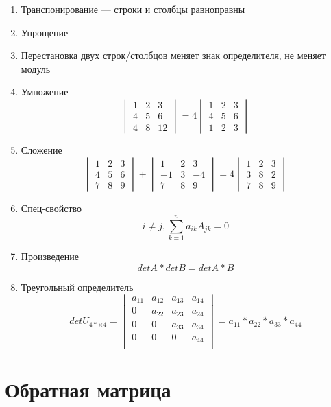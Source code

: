 \documentclass{article}
\begin{document}
\begin{enumerate}
	\item Транспонирование --- строки и столбцы равноправны
	\item Упрощение
	\item Перестановка двух строк/столбцов меняет знак определителя, не меняет модуль
	\item Умножение
	\[
	\begin{vmatrix}
		1 & 2 & 3 \\
		4 & 5 & 6 \\
		4 & 8 & 12
	\end{vmatrix} =
	4 \begin{vmatrix}
		1 & 2 & 3 \\
		4 & 5 & 6 \\
		1 & 2 & 3
	\end{vmatrix}
	\]
	\item Сложение
	\[
	\begin{vmatrix}
		1 & 2 & 3 \\
		4 & 5 & 6 \\
		7 & 8 & 9
	\end{vmatrix} +
	\begin{vmatrix}
		1 & 2 & 3 \\
		-1 & 3 & -4 \\
		7 & 8 & 9
	\end{vmatrix} =
	4 \begin{vmatrix}
		1 & 2 & 3 \\
		3 & 8 & 2 \\
		7 & 8 & 9
	\end{vmatrix}
	\]
	\item Спец-свойство
	\[
	i \ne j, \sum_{k=1}^{n} a_{ik} A_{jk} = 0
	\]
	\item Произведение
	\[
	det A * det B = det A * B
	\]
	\item Треугольный определитель
	\[
	det U_{4*\times 4} =
	\begin{vmatrix}
		a_{11} & a_{12} & a_{13} & a_{14} \\
		0 & a_{22} & a_{23} & a_{24} \\
		0 & 0 & a_{33} & a_{34} \\
		0 & 0 & 0 & a_{44} \\
	\end{vmatrix} =
	a_{11} * a_{22} * a_{33} * a_{44}
	\]
\end{enumerate}

\pagebreak
\section{Обратная матрица}
\end{document}

